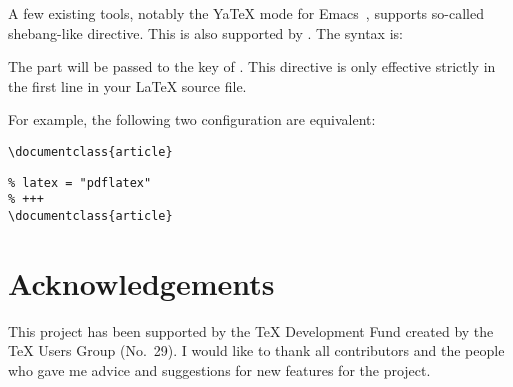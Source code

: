 \documentclass[draft]{llmk-doc}
\begin{document}
A few existing tools, notably the YaTeX mode for Emacs~\cite{yatex}, supports
so-called shebang-like directive. This is also supported by . The
syntax is:
%
\begin{htcode}
\end{htcode}
%
The  part will be passed to the  key of .
This directive is only effective strictly in the first line in your {\LaTeX}
source file.

For example, the following two configuration are equivalent:\\
%
\begin{minipage}[t]{.5\textwidth}
\begin{lstlisting}[style=latex]
%#!pdflatex
\documentclass{article}
\end{lstlisting}
\end{minipage}
\begin{minipage}[t]{.49\textwidth}
\begin{lstlisting}[style=latex]
% +++
% latex = "pdflatex"
% +++
\documentclass{article}
\end{lstlisting}
\end{minipage}

\section{Acknowledgements}

This project has been supported by the {\TeX} Development Fund created by the {\TeX}
Users Group (No.~29). I would like to thank all contributors and the people who
gave me advice and suggestions for new features for the  project.
\end{document}
